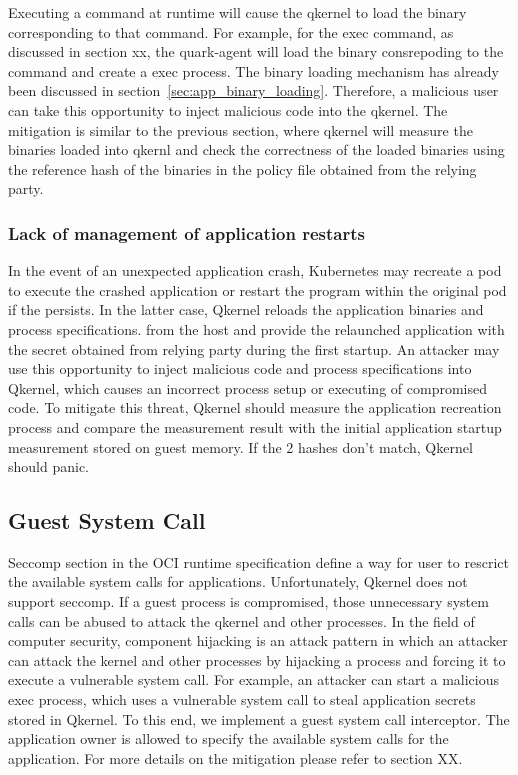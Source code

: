 Executing a command at runtime will cause the qkernel to load the binary corresponding to that command. For example, for the exec command, as discussed in section xx, the quark-agent will load the binary consrepoding to the command and create 
a exec process. The binary loading mechanism has already been discussed in section~\ref{sec:app_binary_loading}. Therefore, a malicious user can take this opportunity to inject malicious code into the qkernel. The mitigation is similar to the previous section, where qkernel 
will measure the binaries loaded into qkernl and check the correctness of the loaded binaries using the reference hash of the binaries in the policy file obtained from the relying party.


\subsubsection{Lack of management of application restarts}

In the event of an unexpected application crash, Kubernetes may recreate a pod to execute the crashed application or restart the program within the original pod if the persists\cite*{k8s}. In the latter case, Qkernel reloads the application binaries 
and process specifications. from the host and provide the relaunched application with the secret obtained from relying party during the first startup. An attacker may use this opportunity to inject malicious code and process specifications into Qkernel, 
which causes an incorrect process setup or executing of compromised code. To mitigate this threat, Qkernel should measure the application recreation process and compare the measurement result with the initial application startup measurement stored 
on guest memory. If the 2 hashes don’t match,  Qkernel should panic.

\subsection{Guest System Call}
Seccomp section in the OCI runtime specification\cite*{oci-spec} define a way for user to rescrict the available system calls for applications.  Unfortunately, Qkernel does not support seccomp\cite*{seccomp}. If a guest process is compromised, 
those unnecessary system calls can be abused to attack the qkernel and other processes. In the field of computer security, component hijacking\cite*{DBLP:journals/corr/WuGLD16} is an attack pattern in which an attacker can attack the kernel and other processes by hijacking a process and forcing it to execute a 
vulnerable system call. For example, an attacker can start a malicious exec process, which uses a vulnerable system call to steal application secrets stored in Qkernel. To this end, we implement a guest system call interceptor. The application 
owner is allowed to specify the available system calls for the application. 
For more details on the mitigation please refer to section XX.

